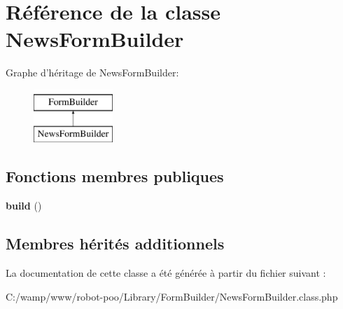 \hypertarget{class_library_1_1_form_builder_1_1_news_form_builder}{\section{Référence de la classe News\+Form\+Builder}
\label{class_library_1_1_form_builder_1_1_news_form_builder}
}
Graphe d'héritage de News\+Form\+Builder\+:\begin{figure}[H]
\begin{center}
\leavevmode
\includegraphics[height=2.000000cm]{class_library_1_1_form_builder_1_1_news_form_builder}
\end{center}
\end{figure}
\subsection*{Fonctions membres publiques}
\begin{DoxyCompactItemize}
\item 
\hypertarget{class_library_1_1_form_builder_1_1_news_form_builder_a3928875ef0ceb18a51c1061be3eb3a00}{{\bfseries build} ()}\label{class_library_1_1_form_builder_1_1_news_form_builder_a3928875ef0ceb18a51c1061be3eb3a00}

\end{DoxyCompactItemize}
\subsection*{Membres hérités additionnels}


La documentation de cette classe a été générée à partir du fichier suivant \+:\begin{DoxyCompactItemize}
\item 
C\+:/wamp/www/robot-\/poo/\+Library/\+Form\+Builder/News\+Form\+Builder.\+class.\+php\end{DoxyCompactItemize}
